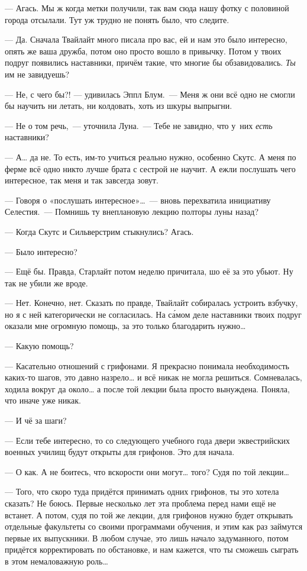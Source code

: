 \documentclass[fontsize=11pt,a5paper,titlepage=firstcover]{scrbook}
\begin{document}
--- Агась. Мы ж когда метки получили, так вам сюда нашу фотку с половиной города отсылали. Тут уж трудно не понять было, что следите.

--- Да. Сначала Твайлайт много писала про вас, ей и нам это было интересно, опять же ваша дружба, потом оно просто вошло в привычку. Потом у твоих подруг появились наставники, причём такие, что многие бы обзавидовались. \emph{Ты} им не завидуешь?

--- Не, с чего бы?! --- удивилась Эппл Блум.~--- Меня ж они всё одно не смогли бы научить ни летать, ни колдовать, хоть из шкуры выпрыгни.

--- Не о том речь,~--- уточнила Луна.~--- Тебе не завидно, что у~них \emph{есть} наставники?

--- А{\ldots} да не. То есть, им-то учиться реально нужно, особенно Скутс. А меня по ферме всё одно никто лучше брата с сестрой не научит. А ежли послушать чего интересное, так меня и так завсегда зовут.

--- Говоря о «послушать интересное»{\ldots}~--- вновь перехватила инициативу Селестия.~--- Помнишь ту внеплановую лекцию полторы луны назад?

--- Когда Скутс и Сильверстрим стыкнулись? Агась.

--- Было интересно?

--- Ещё бы. Правда, Старлайт потом неделю причитала, шо её за это убьют. Ну так не убили же вроде.

--- Нет. Конечно, нет. Сказать по правде, Твайлайт собиралась устроить взбучку, но я с ней категорически не согласилась. На са́мом деле наставники твоих подруг оказали мне огромную помощь, за это только благодарить нужно{\ldots}

--- Какую помощь?

--- Касательно отношений с грифонами. Я прекрасно понимала необходимость каких-то шагов, это давно назрело{\ldots} и всё никак не могла решиться. Сомневалась, ходила вокруг да около{\ldots} а после той лекции была просто вынуждена. Поняла, что иначе уже никак.

--- И чё за шаги?

--- Если тебе интересно, то со следующего учебного года двери эквестрийских военных училищ будут открыты для грифонов. Это для начала.

--- О как. А не боитесь, что вскорости они могут{\ldots} того? Судя по той лекции{\ldots}

--- Того, что скоро туда придётся принимать одних грифонов, ты это хотела сказать? Не боюсь. Первые несколько лет эта проблема перед нами ещё не встанет. А потом, судя по той же лекции, для грифонов нужно будет открывать отдельные факультеты со своими программами обучения, и этим как раз займутся первые их выпускники. В любом случае, это лишь начало задуманного, потом придётся корректировать по обстановке, и нам кажется, что ты сможешь сыграть в этом немаловажную роль{\ldots}
\end{document}
